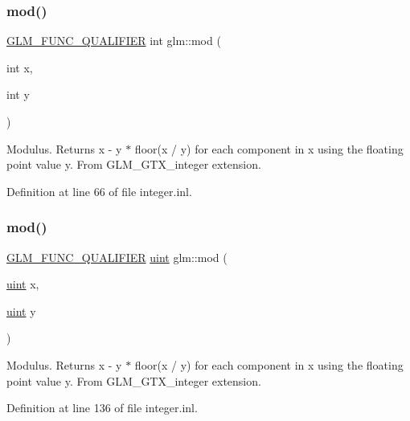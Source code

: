 \subsubsection{\texorpdfstring{mod()}{mod()}\hspace{0.1cm}{\footnotesize\ttfamily [1/2]}}
{\footnotesize\ttfamily \mbox{\hyperlink{setup_8hpp_a33fdea6f91c5f834105f7415e2a64407}{G\+L\+M\+\_\+\+F\+U\+N\+C\+\_\+\+Q\+U\+A\+L\+I\+F\+I\+ER}} int glm\+::mod (\begin{DoxyParamCaption}\item[{int}]{x,  }\item[{int}]{y }\end{DoxyParamCaption})}

Modulus. Returns x -\/ y $\ast$ floor(x / y) for each component in x using the floating point value y. From G\+L\+M\+\_\+\+G\+T\+X\+\_\+integer extension. 

Definition at line 66 of file integer.\+inl.

\mbox{\label{group__gtx__integer_gab8f9ec0ca93ca90669434224818f0750}} 
\subsubsection{\texorpdfstring{mod()}{mod()}\hspace{0.1cm}{\footnotesize\ttfamily [2/2]}}
{\footnotesize\ttfamily \mbox{\hyperlink{setup_8hpp_a33fdea6f91c5f834105f7415e2a64407}{G\+L\+M\+\_\+\+F\+U\+N\+C\+\_\+\+Q\+U\+A\+L\+I\+F\+I\+ER}} \mbox{\hyperlink{group__core__precision_ga4fd29415871152bfb5abd588334147c8}{uint}} glm\+::mod (\begin{DoxyParamCaption}\item[{\mbox{\hyperlink{group__core__precision_ga4fd29415871152bfb5abd588334147c8}{uint}}}]{x,  }\item[{\mbox{\hyperlink{group__core__precision_ga4fd29415871152bfb5abd588334147c8}{uint}}}]{y }\end{DoxyParamCaption})}

Modulus. Returns x -\/ y $\ast$ floor(x / y) for each component in x using the floating point value y. From G\+L\+M\+\_\+\+G\+T\+X\+\_\+integer extension. 

Definition at line 136 of file integer.\+inl.

\mbox{\label{group__gtx__integer_gacbe62fd2384464c16ea30ecc4defc11c}} 
